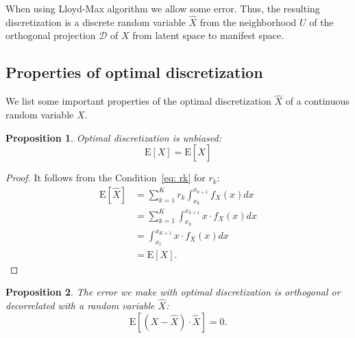 \documentclass[10pt]{article}
\newtheorem{prop}{Proposition}
\begin{document}
When using Lloyd-Max algorithm we allow some error. Thus, the resulting discretization is a discrete random variable $\hat{X}$ from the neighborhood $U$ of the orthogonal projection $\mathcal{D}$ of $X$ from latent space to manifest space.

\subsection{Properties of optimal discretization}
We list some important properties of the optimal discretization $\hat{X}$ of a continuous random variable $X$.

\begin{prop} \label{thm: E}
Optimal discretization is unbiased:
\begin{equation}
\mathrm{E}[X] = \mathrm{E}[\hat{X}]
\end{equation}
\end{prop}

\begin{proof}
It follows from the Condition~\ref{eq: rk} for $r_{k}$:
\begin{align*}
\mathrm{E}[\hat{X}] &= \sum_{k=1}^{K} r_{k} \int_{x_{k}}^{x_{k+1}} f_{X}(x) dx \\
	&= \sum_{k=1}^{K} \int_{x_{k}}^{x_{k+1}} x \cdot f_{X}(x) dx \\
	&= \int_{x_{1}}^{x_{K+1}} x \cdot f_{X}(x) dx \\
	&= \mathrm{E}[X].
\end{align*}
\end{proof}



\begin{prop} \label{thm: decor}
The error we make with optimal discretization is orthogonal or decorrelated with a random variable $\hat{X}$:
\begin{equation}
\mathrm{E} \left[ \left(X - \hat{X}\right) \cdot \hat{X} \right] = 0.
\end{equation}
\end{prop}
\end{document}
